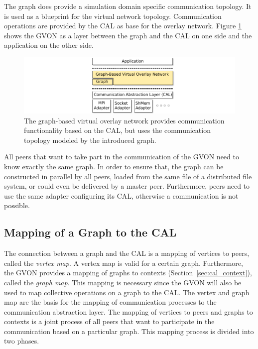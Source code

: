 The graph does provide a simulation domain specific communication
topology.  It is used as a blueprint for the virtual network topology.
Communication operations are provided by the CAL as base for the
overlay network.  Figure \ref{fig:gvon} shows the GVON as a layer
between the graph and the CAL on one side and the application on the other
side.

\begin{figure}[H]
  \centering \includegraphics[width=\textwidth]{graphics/30_gvon}
  \caption{The graph-based virtual overlay network provides
    communication functionality based on the CAL, but uses the
    communication topology modeled by the introduced graph.}
  \label{fig:gvon}
\end{figure}

\noindent All peers that want to take part in the communication of the GVON need
to know exactly the same graph. In order to ensure that, the graph can be
constructed in parallel by all peers, loaded from the same file of a
distributed file system, or could even be delivered by a master
peer. Furthermore, peers need to use the same adapter configuring its
CAL, otherwise a communication is not possible.


\subsection{Mapping of a Graph to the CAL}
\label{sec:mapping}
The connection between a graph and the CAL is a mapping of vertices
to peers, called the \emph{vertex map}.  A vertex map is valid for a
certain graph. Furthermore, the GVON provides a mapping of  graphs
to contexts (Section~\ref{sec:cal_context}), called the \emph{graph
  map}. This mapping is necessary since the GVON will also be used to
map collective operations on a graph to the CAL.  The vertex and
graph map are the basis for the mapping of communication processes
to the communication abstraction layer.  The mapping of vertices to
peers and graphs to contexts is a joint process of all peers that want to
participate in the communication based on a particular graph. This
mapping process is divided into two phases.

